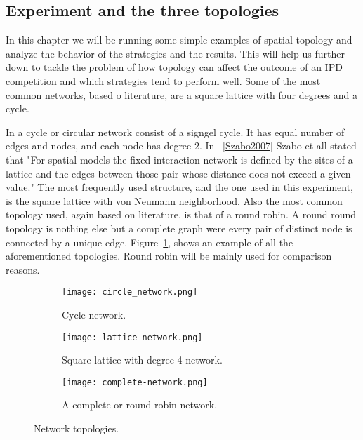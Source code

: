 \subsection{Experiment and the three topologies}

In this chapter we will be running some simple examples of spatial topology and
analyze the behavior of the strategies and the results. This will help us further
down to tackle the problem of how topology can affect the outcome of an IPD
competition and which strategies tend to perform well. Some of the most common
networks, based o literature, are a square lattice with four degrees
and a cycle.

In a cycle or circular network consist of a signgel cycle. It has
equal number of edges and nodes, and each node has degree 2. In ~\ref{Szabo2007}
Szabo et all stated that "For spatial models the fixed interaction network is
defined by the sites of a lattice and the edges between those pair whose distance
does not exceed a given value."  The most frequently used structure, and the one
used in this experiment, is the square lattice with von Neumann neighborhood.
Also the most common topology used, again based on literature, is that of a
round robin. A round round topology is nothing else but a complete
graph were every pair of distinct node is connected by a unique edge.
Figure~\ref{fig:networks}, shows an example of all the aforementioned topologies.
Round robin will be mainly used for comparison reasons.

\begin{figure}[h]
\centering
    \begin{subfigure}[t]{0.45\textwidth}
    \centering
        \texttt{[image: circle\_network.png]}
    \caption{Cycle network.}
    \end{subfigure}
\hfill
    \begin{subfigure}[t]{0.45\textwidth}\centering
    \centering
        \texttt{[image: lattice\_network.png]}
    \caption{Square lattice with degree 4 network.}
    \end{subfigure}
\hfill
    \begin{subfigure}[t]{0.45\textwidth}\centering
    \centering
        \texttt{[image: complete-network.png]}
    \caption{A complete or round robin network.}
    \end{subfigure}
\caption{Network topologies.}
\label{fig:networks}
\end{figure}

